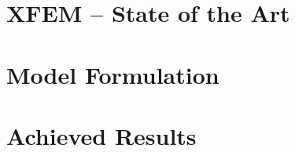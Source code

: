 \documentclass[bibliography=totocnumbered,dvipsnames,FM,Dis]{tulthesis}
\begin{document}




\chapter{XFEM -- State of the Art} \label{chap:soa}







\chapter{Model Formulation} \label{chap:model}






\chapter{Achieved Results} \label{chap:results}







\end{document}
